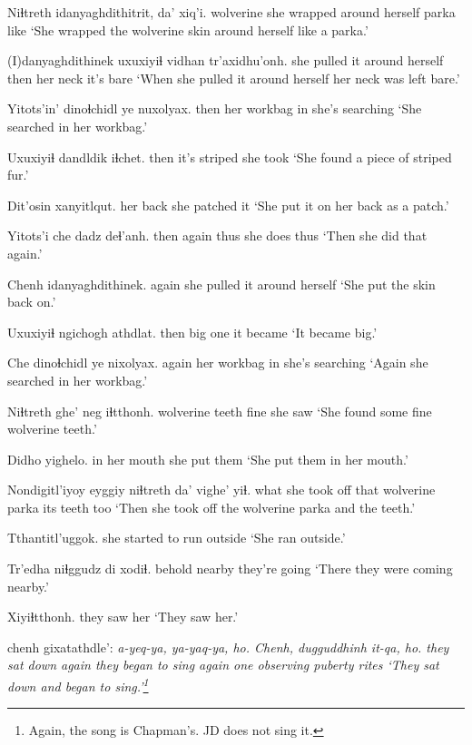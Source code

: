 \documentclass[12pt]{article}
\begin{document}
\gll Niɬtreth idanyaghdithitrit,  da' xiq'i.
wolverine {she wrapped around herself} parka like
\glt `She wrapped the wolverine skin around herself like a parka.'
\glend

\gll (I)danyaghdithinek  uxuxiyiɬ vidhan tr'axidhu'onh.
{she pulled it around herself} then {her neck} {it's bare}
\glt `When she pulled it around herself her neck was left bare.'
\glend

\gll Yitots'in' dinoɬchidl ye nuxolyax.
then  {her workbag} in {she's searching}
\glt `She searched in her workbag.'
\glend

\gll Uxuxiyiɬ dandldik  iɬchet.
then  {it's striped} {she took}
\glt `She found a piece of striped fur.'
\glend

\gll Dit'osin xanyitlqut.
{her back} {she patched it}
\glt `She put it on her back as a patch.'
\glend

\gll Yitots'i che dadz deɬ'anh.
then  again thus {she does thus}
\glt `Then she did that again.'
\glend

\gll Chenh  idanyaghdithinek.
again  {she pulled it around herself}
\glt `She put the skin back on.'
\glend

\gll Uxuxiyiɬ ngichogh athdlat.
then  {big one} {it became}
\glt `It became big.'
\glend

\gll Che dinoɬchidl ye nixolyax.
again {her workbag} in {she's searching}
\glt `Again she searched in her workbag.'
\glend

\gll Niɬtreth ghe' neg iɬtthonh.
wolverine teeth fine {she saw}
\glt `She found some fine wolverine teeth.'
\glend

\gll Didho yighelo.
{in her mouth} {she put them}
\glt `She put them in her mouth.'
\glend

\gll Nondigitl'iyoy eyggiy niɬtreth da' vighe' yiɬ.
{what she took off} that  wolverine parka {its teeth} too
\glt `Then she took off the wolverine parka and the teeth.'
\glend

\gll Tthantitl'uggok.
{{she started to run outside}}
\glt `She ran outside.'
\glend

\gll Tr'edha {niɬggudz di} xodiɬ.
behold  nearby  {they're going}
\glt `There they were coming nearby.'
\glend

\gll Xiyiɬtthonh.
{{they saw her}}
\glt `They saw her.'
\glend

 chenh gixatathdle':  \em {a-yeq-ya, ya-yaq-ya, ho.} Chenh, dugguddhinh \em {it-qa, ho.}
{they sat down}  again {they began to sing} {} again {one observing puberty rites} {}
\glt `They sat down and began to sing.'\footnote{Again, the song is Chapman's. JD does not sing it.}
\glend
\end{document}
